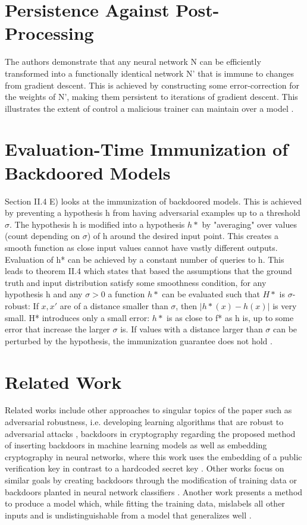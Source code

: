 \documentclass[
	fontsize=12pt,
	headings=small,
	parskip=quarter,
	bibliography=totoc,
	numbers=noenddot,       
	open=any,               
 	final                   
]{scrreprt}
\begin{document}
\section{Persistence Against Post-Processing}
The authors demonstrate that any neural network N can be efficiently transformed into a functionally identical network N’ that is immune to changes from gradient descent. This is achieved by constructing some error-correction for the weights of N’, making them persistent to iterations of gradient descent. This illustrates the extent of control a malicious trainer can maintain over a model \cite{madry2018adversarial}.  



\section{Evaluation-Time Immunization of Backdoored Models}
Section II.4 E) looks at the immunization of backdoored models. This is achieved by preventing a hypothesis h from having adversarial examples up to a threshold $\sigma$. The hypothesis h is modified into a hypothesis $h*$ by "averaging" over values (count depending on $\sigma$) of h around the desired input point. This creates a smooth function as close input values cannot have vastly different outputs. Evaluation of h* can be achieved by a constant number of queries to h. This leads to theorem II.4 which states that based the assumptions that the ground truth and input distribution satisfy some smoothness condition, for any hypothesis h and any $\sigma > 0$ a function $h*$ can be evaluated such that  $H*$ is $\sigma$-robust: If $x,x'$ are of a distance smaller than $\sigma$, then $|h*(x)-h(x)|$ is very small. H* introduces only a small error: $h*$ is as close to f* as h is, up to some error that increase the larger $\sigma$ is.  If values with a distance larger than $\sigma$ can be perturbed by the hypothesis, the immunization guarantee does not hold \cite{song2017machine}.  



\section{Related Work}
Related works include other approaches to singular topics of the paper such as adversarial robustness, i.e. developing learning algorithms that are robust to adversarial attacks \cite{madry2018adversarial}, backdoors in cryptography regarding the proposed method of inserting backdoors in machine learning models as well as embedding cryptography in neural networks, where this work uses the embedding of a public verification key in contrast to a hardcoded secret key \cite{liu2018trojaning}. Other works focus on similar goals by creating backdoors through the modification of training data or backdoors planted in neural network classifiers \cite{gu2017badnets}. Another work presents a method to produce a model which, while fitting the training data, mislabels all other inputs and is undistinguishable from a model that generalizes well \cite{goldwasser2022backdoors}. 




\end{document}
